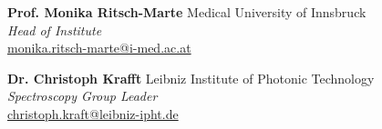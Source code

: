 \documentclass[a4paper,10pt]{article}
\begin{document}
\textbf{Prof. Monika Ritsch-Marte} \hfill Medical University of Innsbruck \\
\textit{Head of Institute} \\
\href{mailto:monika.ritsch-marte@i-med.ac.at}{monika.ritsch-marte@i-med.ac.at}

\vspace{10pt}

\textbf{Dr. Christoph Krafft} \hfill Leibniz Institute of Photonic Technology \\
\textit{Spectroscopy Group Leader} \\
\href{mailto:christoph.kraft@leibniz-ipht.de}{christoph.kraft@leibniz-ipht.de}

\vspace{10pt}
\end{document}

